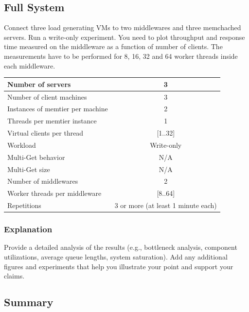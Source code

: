 \documentclass[11pt,a4paper]{article}
\begin{document}
\subsection{Full System}

Connect three load generating VMs to two middlewares and three memchached servers. Run a write-only experiment. 
You need to plot throughput and response time measured on the middleware as a function of number of clients. The measurements have to be performed for 8, 16, 32 and 64 worker threads inside each middleware.

\begin{center}
	\scriptsize{
		\begin{tabular}{|l|c|}
			\hline Number of servers                & 3          \\ 
			\hline Number of client machines        & 3          \\ 
			\hline Instances of memtier per machine & 2          \\ 
			\hline Threads per memtier instance     & 1          \\
			\hline Virtual clients per thread       & [1..32]    \\ 
			\hline Workload                         & Write-only \\
			\hline Multi-Get behavior               & N/A        \\
			\hline Multi-Get size                   & N/A        \\
			\hline Number of middlewares            & 2          \\
			\hline Worker threads per middleware    & [8..64]    \\
			\hline Repetitions                      & 3 or more (at least 1 minute each)  \\ 
			\hline 
		\end{tabular}
	} 
\end{center}

\subsubsection{Explanation}

Provide a detailed analysis of the results (e.g., bottleneck analysis, component utilizations, average queue lengths, system saturation). Add any additional figures and experiments that help you illustrate your point and support your claims.

\subsection{Summary}
\end{document}
